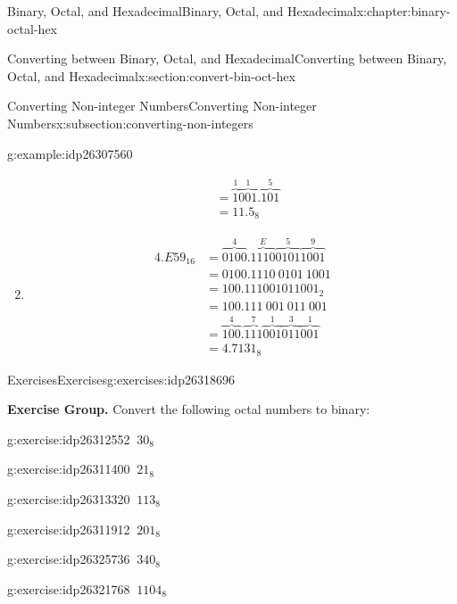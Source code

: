 \documentclass[twoside,10pt,]{book}
\numberwithin{equation}{section}
\newcommand{\amp}{&}
\begin{document}
\begin{chapterptx}{Binary, Octal, and Hexadecimal}{}{Binary, Octal, and Hexadecimal}{}{}{x:chapter:binary-octal-hex}
\begin{sectionptx}{Converting between Binary, Octal, and Hexadecimal}{}{Converting between Binary, Octal, and Hexadecimal}{}{}{x:section:convert-bin-oct-hex}
\begin{subsectionptx}{Converting Non-integer Numbers}{}{Converting Non-integer Numbers}{}{}{x:subsection:converting-non-integers}
\begin{example}{}{g:example:idp26307560}
\begin{enumerate}
\begin{align*}
\amp = \overbrace{1}^1\overbrace{001}^1.\overbrace{101}^5\\
\amp = 11.5_8
\end{align*}
%
\item{}%
\begin{align*}
4.E59_{16} \amp = \overbrace{0100}^4.\overbrace{1110}^E\overbrace{0101}^5\overbrace{1001}^9\\
\amp = 0100.1110\ 0101\ 1001\\
\amp = 100.111001011001_2\\
\amp = 100.111\ 001\ 011\ 001\\
\amp = \overbrace{100}^4.\overbrace{111}^7\overbrace{001}^1\overbrace{011}^3\overbrace{001}^1\\
\amp = 4.7131_8
\end{align*}
%
\end{enumerate}
\end{example}
\end{subsectionptx}
%
%
\typeout{************************************************}
\typeout{************************************************}
%
\begin{exercises-subsection}{Exercises}{}{Exercises}{}{}{g:exercises:idp26318696}
\par\medskip\noindent%
\textbf{Exercise Group.}\space\space%
Convert the following octal numbers to binary:\begin{exercisegroup}
\begin{divisionexerciseeg}{1}{}{}{g:exercise:idp26312552}%
\(\ 30_8\)\end{divisionexerciseeg}%
\begin{divisionexerciseeg}{2}{}{}{g:exercise:idp26311400}%
\(\ 21_8\)\end{divisionexerciseeg}%
\begin{divisionexerciseeg}{3}{}{}{g:exercise:idp26313320}%
\(\ 113_8\)\end{divisionexerciseeg}%
\begin{divisionexerciseeg}{4}{}{}{g:exercise:idp26311912}%
\(\ 201_8\)\end{divisionexerciseeg}%
\begin{divisionexerciseeg}{5}{}{}{g:exercise:idp26325736}%
\(\ 340_8\)\end{divisionexerciseeg}%
\begin{divisionexerciseeg}{6}{}{}{g:exercise:idp26321768}%
\(\ 1104_8\)\end{divisionexerciseeg}%
\end{exercisegroup}

\end{exercises-subsection}
\end{sectionptx}
\end{chapterptx}
\end{document}
